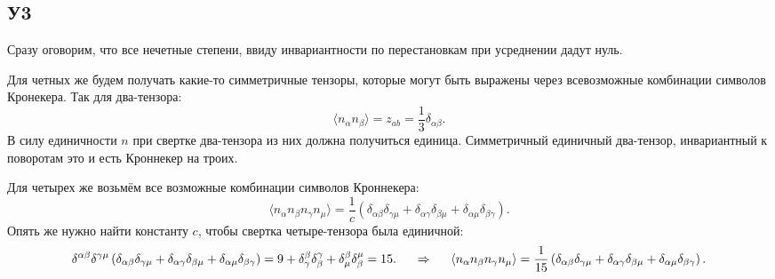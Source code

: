 \subsection*{У3}
Сразу оговорим, что все нечетные степени, ввиду инвариантности по перестановкам при усреднении дадут нуль.

Для четных же будем получать какие-то симметричные тензоры, которые могут быть выражены через всевозможные комбинации символов Кронекера. Так для два-тензора:
\begin{equation*}
	 \langle n_\alpha n_\beta\rangle = z_{a b} = \frac{1}{3} \delta_{\alpha \beta}.
\end{equation*}
В силу единичности $n$ при свертке два-тензора из них должна получиться единица. Симметричный единичный два-тензор, инвариантный к поворотам это и есть Кроннекер на троих.

Для четырех же возьмём все возможные комбинации символов Кроннекера:
\begin{equation*}
	\langle n_\alpha n_\beta n_\gamma n_\mu\rangle = \frac{1}{c} 
	\left(
	\delta_{\alpha \beta} \delta_{\gamma \mu} + \delta_{\alpha \gamma} \delta_{\beta \mu} + \delta_{\alpha \mu} \delta_{\beta \gamma}
	\right).
\end{equation*}
Опять же нужно найти константу $c$, чтобы свертка четыре-тензора была единичной:
\begin{equation*}
	\delta^{\alpha \beta} \delta^{\gamma \mu}\left(
	\delta_{\alpha \beta} \delta_{\gamma \mu} + \delta_{\alpha \gamma} \delta_{\beta \mu} + \delta_{\alpha \mu} \delta_{\beta \gamma}
	\right) = 9 + \delta_{\gamma}^{\beta} \delta_{\beta}^{\gamma}  + \delta_{\mu}^{\beta} \delta_{\beta}^{\mu} = 15.
	\hspace{0.5 cm}
	 \Rightarrow
	 \hspace{0.5 cm}
	 \langle n_\alpha n_\beta n_\gamma n_\mu\rangle = \frac{1}{15} 
	\left(
	\delta_{\alpha \beta} \delta_{\gamma \mu} + \delta_{\alpha \gamma} \delta_{\beta \mu} + \delta_{\alpha \mu} \delta_{\beta \gamma}
	\right).
\end{equation*}
